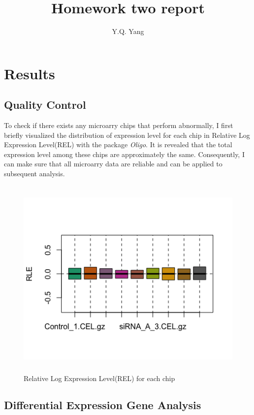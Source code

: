 \documentclass[fleqn,10pt]{wlscirep}
\title{Homework two report}
\author[1,*]{Y.Q. Yang}
\begin{document}
\flushbottom
\maketitle

\thispagestyle{empty}

\section*{Results}

\subsection*{Quality Control}

To check if there exists any microarry chips that perform abnormally, I first briefly visualized the distribution of expression level for each chip in Relative Log Expression Level(REL) with the package \textit{Oligo}. \cite{csdn.net} It is revealed that the total expression level among these chips are approximately the same.  Consequently, I can make sure that all microarry data are reliable and can be applied to subsequent analysis.

\begin{figure}[ht]
    \centering
    \includegraphics[width=15cm,height=10cm]{RLE.png}
    \caption{Relative Log Expression Level(REL) for each chip}
    \label{fig:stream}
    \end{figure}

\subsection*{Differential Expression Gene Analysis}
\end{document}
